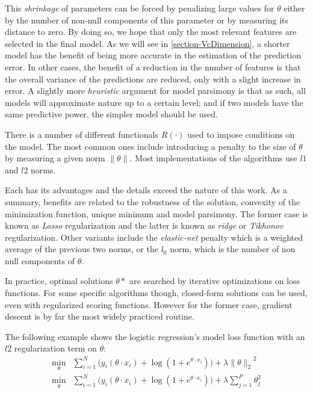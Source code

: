 This \textit{shrinkage} of parameters can be forced by penalizing large values for $\theta$ either by the number of non-null components of this parameter or by measuring its distance to zero. By doing so, we hope that only the most relevant features are selected in the final model. As we will see in \cref{section-VcDimension}, a shorter model has the benefit of being more accurate in the estimation of the prediction error. In other cases, the benefit of a reduction in the number of features is that the overall variance of the predictions are reduced, only with a slight increase in error. A slightly more \textit{heuristic} argument for model parsimony is that as such, all models will approximate nature up to a certain level; and if two models have the same predictive power, the simpler model should be used.


There is a number of different functionals $R(\cdot)$ used to impose conditions on the model. The most common ones include introducing a penalty to the size of $\theta$ by measuring a given norm $\| \theta \|$. Most implementations of the algorithms use $l1$ and $l2$ norms.

Each has its advantages and the details exceed the nature of this work. As a summary, benefits are related to the robustness of the solution, convexity of the minimization function, unique minimum and model parsimony. The former case is known as \textit{ Lasso} regularization and the latter is known as \textit{ridge} or \textit{Tikhonov} regularization. Other variants include the \textit{elastic-net} penalty which is a weighted average of the previous two norms, or the $l_0$ norm, which is the number of non null components of $\theta$.


In practice, optimal solutions $\theta*$ are searched by iterative optimizations on loss functions.
For some specific algorithms though, closed-form solutions can be used, even with regularized scoring functions.
However for the former case, gradient descent is by far the most widely practiced routine.

The following example shows the logistic regression's model loss function with an $l2$ regularization term on $\theta$:
\begin{equation}\label{eq:logitRegularization}
\begin{split}
\min_{\theta} & \sum_{i=1}^N \big(y_i ( \theta \cdot x_i ) + \log(1 + e^{\theta \cdot x_i} ) \big) + \lambda { \| \theta \|_{2}}^2 \\
\min_{\theta} & \sum_{i=1}^N \big(y_i ( \theta \cdot x_i ) + \log(1 + e^{\theta \cdot x_i} ) \big) + \lambda \sum_{j=1}^P \theta_j^2
\end{split}
\end{equation}

